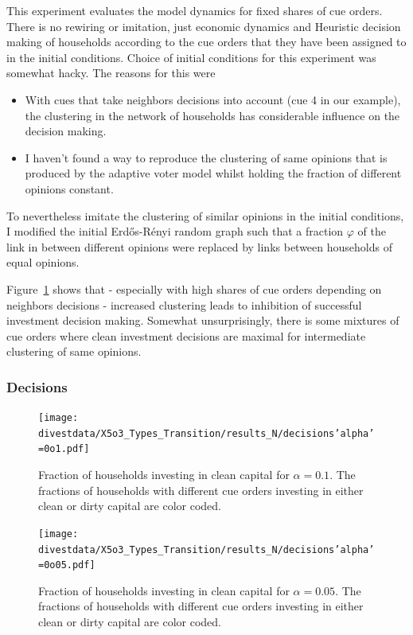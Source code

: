 This experiment evaluates the model dynamics for fixed shares of cue orders. There is no rewiring or imitation, just economic dynamics and Heuristic decision making of households according to the cue orders that they have been assigned to in the initial conditions.
Choice of initial conditions for this experiment was somewhat hacky. The reasons for this were
\begin{itemize}
	\item With cues that take neighbors decisions into account (cue 4 in our example), the clustering in the network of households has considerable influence on the decision making.
	\item I haven't found a way to reproduce the clustering of same opinions that is produced by the adaptive voter model whilst holding the fraction of different opinions constant. 
\end{itemize}
To nevertheless imitate the clustering of similar opinions in the initial conditions, I modified the initial Erd\H{o}s-R\'enyi random graph such that a fraction $\varphi$ of the link in between different opinions were replaced by links between households of equal opinions. 
\par
Figure~\ref{5o3_1} shows that - especially with high shares of cue orders depending on neighbors decisions - increased clustering leads to inhibition of successful investment decision making. Somewhat unsurprisingly, there is some mixtures of cue orders where clean investment decisions are maximal for intermediate clustering of same opinions.
\subsubsection{Decisions}
\begin{figure}[H]
	\centering
	\texttt{[image: divestdata/X5o3\_Types\_Transition/results\_N/decisions'alpha'=0o1.pdf]}
	\caption{Fraction of households investing in clean capital for $\alpha=0.1$. The fractions of households with different cue orders investing in either clean or dirty capital are color coded.}
	\label{5o3_1}
\end{figure}
\begin{figure}[H]
	\centering
	\texttt{[image: divestdata/X5o3\_Types\_Transition/results\_N/decisions'alpha'=0o05.pdf]}
	\caption{Fraction of households investing in clean capital for $\alpha=0.05$. The fractions of households with different cue orders investing in either clean or dirty capital are color coded.}
	\label{5o3_2}
\end{figure} 
